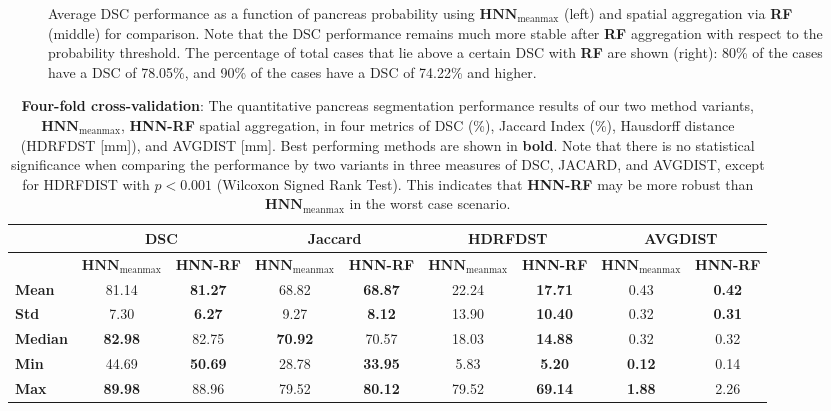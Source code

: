 \documentclass[journal]{IEEEtran}
\begin{document}
\begin{figure*}[htb]%
\centering	{}
	\caption{\small Average DSC performance as a function of pancreas probability using $\mathbf{HNN}_\mathrm{meanmax}$ (left) and spatial aggregation via \textbf{RF} (middle) for comparison. Note that the DSC performance remains much more stable after \textbf{RF} aggregation with respect to the probability threshold. The percentage of total cases that lie  above a certain DSC with \textbf{RF} are shown (right): 80\% of the cases have a DSC of 78.05\%, and 90\% of the cases have a DSC of 74.22\% and higher.}
	\label{fig:avg_dsc}
\end{figure*}
\begin{table*}[htb]
\begin{center}
\caption{\small \textbf{Four-fold cross-validation}: The quantitative pancreas segmentation performance results of our two method variants, $\mathbf{HNN}_\mathrm{meanmax}$, \textbf{HNN-RF} spatial aggregation, in four metrics of DSC (\%), Jaccard Index (\%), Hausdorff distance (HDRFDST [mm]), and AVGDIST [mm]. Best performing methods are shown in \textbf{bold}. Note that there is no statistical significance when comparing the performance by two variants in three measures of DSC, JACARD, and AVGDIST, except for HDRFDIST with $p<0.001$ (Wilcoxon Signed Rank Test). This indicates that \textbf{HNN-RF} may be more robust than $\mathbf{HNN}_\mathrm{meanmax}$ in the worst case scenario.}
\label{tab:results2}
\begin{tabular}{l|c|c|c|c|c|c|c|c}
    \toprule
		\toprule
    ~ & \multicolumn{2}{|c|}{DSC} & \multicolumn{2}{|c|}{Jaccard} & \multicolumn{2}{|c|}{HDRFDST}  & \multicolumn{2}{|c|}{AVGDIST} \\
		\midrule 
		~ & $\mathbf{HNN}_\mathrm{meanmax}$ & \textbf{HNN-RF} & $\mathbf{HNN}_\mathrm{meanmax}$ & \textbf{HNN-RF} & $\mathbf{HNN}_\mathrm{meanmax}$ & \textbf{HNN-RF} & $\mathbf{HNN}_\mathrm{meanmax}$ & \textbf{HNN-RF} \\	
		\midrule 	
\textbf{Mean}	    &81.14 & \textbf{81.27}   &68.82 &\textbf{68.87}    &22.24 & \textbf{17.71}   &0.43 & \textbf{0.42}   \\
\textbf{Std}      &7.30  & \textbf{6.27}  	&9.27  &\textbf{8.12}     &13.90 & \textbf{10.40}   &0.32 & \textbf{0.31}  \\
\textbf{Median}   &\textbf{82.98} & 82.75		&\textbf{70.92} &70.57    &18.03 & \textbf{14.88}	  &0.32	&	0.32	\\
\textbf{Min}	    &44.69 & \textbf{50.69} 	&28.78 &\textbf{33.95}    &5.83  & \textbf{5.20}	  &\textbf{0.12}		&0.14 \\
\textbf{Max}	    &\textbf{89.98} & 88.96  	&79.52 &\textbf{80.12}    &79.52 & \textbf{69.14}   &\textbf{1.88}		&2.26 \\
    \bottomrule
		\bottomrule
\end{tabular}%
\end{center} 
\end{table*}%
\end{document}
